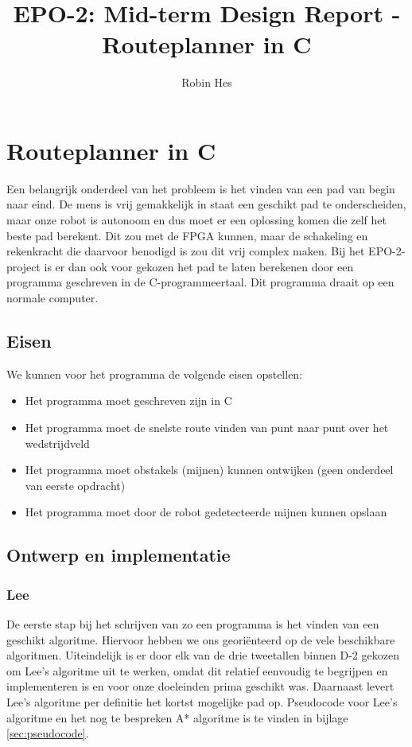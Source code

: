 \documentclass{report}
\title{EPO-2: Mid-term Design Report - Routeplanner in C}
\author{Robin Hes}
\begin{document}
\chapter{Routeplanner in C}
\label{ch:route}

Een belangrijk onderdeel van het probleem is het vinden van een pad van begin naar eind. De mens is vrij gemakkelijk in staat een geschikt pad te onderscheiden, maar onze robot is autonoom en dus moet er een oplossing komen die zelf het beste pad berekent. Dit zou met de FPGA kunnen, maar de schakeling en rekenkracht die daarvoor benodigd is zou dit vrij complex maken. Bij het EPO-2-project is er dan ook voor gekozen het pad te laten berekenen door een programma geschreven in de C-programmeertaal. Dit programma draait op een normale computer.

\section{Eisen}
\label{route-eisen}

We kunnen voor het programma de volgende eisen opstellen:

\begin{itemize}
	\item Het programma moet geschreven zijn in C
	\item Het programma moet de snelste route vinden van punt naar punt over het wedstrijdveld
	\item Het programma moet obstakels (mijnen) kunnen ontwijken (geen onderdeel van eerste opdracht)
	\item Het programma moet door de robot gedetecteerde mijnen kunnen opslaan
\end{itemize}

\section{Ontwerp en implementatie}
\label{sec:ontwerp-impl}

\subsection{Lee}
\label{ssec:lee}

De eerste stap bij het schrijven van zo een programma is het vinden van een geschikt algoritme. Hiervoor hebben we ons georiënteerd op de vele beschikbare algoritmen. Uiteindelijk is er door elk van de drie tweetallen binnen D-2 gekozen om Lee's algoritme uit te werken, omdat dit relatief eenvoudig te begrijpen en implementeren is en voor onze doeleinden prima geschikt was. Daarnaast levert Lee's algoritme per definitie het kortst mogelijke pad op. Pseudocode voor Lee's algoritme en het nog te bespreken A* algoritme is te vinden in bijlage \ref{sec:pseudocode}.
\end{document}
